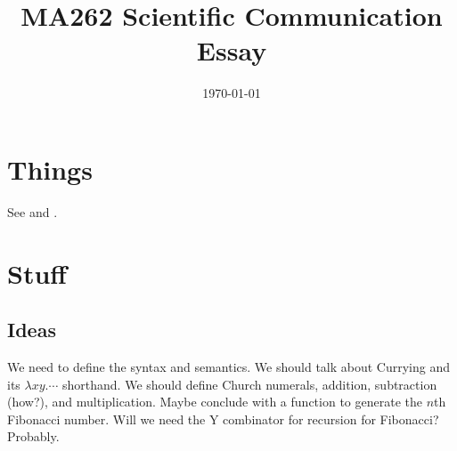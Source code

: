 \documentclass[a4paper, 11pt]{article}
\title{MA262 Scientific Communication Essay}
\date{\today}
\begin{document}
\maketitle

\setlength{\parindent}{0em}
\setlength{\parskip}{1em}

\tableofcontents
\newpage


\section{Things}

See \parencite[pp.~7--10]{barendregt-1981-lambda-calculus} and \citeauthor{church-1965-calculi-lambda-conversion}.

\section{Stuff}

\subsection{Ideas}

We need to define the syntax and semantics. We should talk about Currying and its $\lambda x y . \cdots$ shorthand. We should define Church numerals, addition, subtraction (how?), and multiplication. Maybe conclude with a function to generate the $n$th Fibonacci number. Will we need the Y combinator for recursion for Fibonacci? Probably.

\newpage
\nocite{*} %
\printbibliography[]
\end{document}
